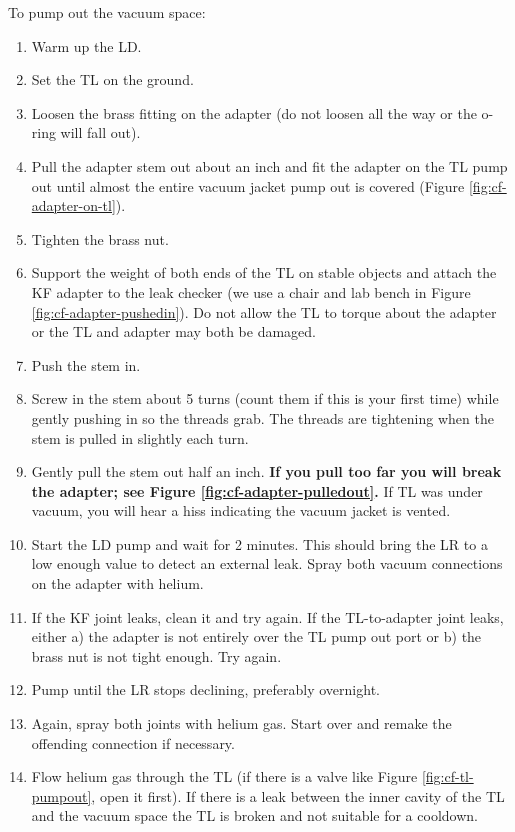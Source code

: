 To pump out the vacuum space:

\begin{enumerate}
 \item Warm up the LD.
 \item Set the TL on the ground.
 \item Loosen the brass fitting on the adapter (do not loosen all the way or the o-ring will fall out).
 \item Pull the adapter stem out about an inch and fit the adapter on the TL pump out until almost the entire vacuum jacket pump out is covered (Figure \ref{fig:cf-adapter-on-tl}).
 \item Tighten the brass nut.
 \item Support the weight of both ends of the TL on stable objects and attach the KF adapter to the leak checker (we use a chair and lab bench in Figure \ref{fig:cf-adapter-pushedin}).  Do not allow the TL to torque about the adapter or the TL and adapter may both be damaged.
 \item Push the stem in.
 \item Screw in the stem about 5 turns (count them if this is your first time) while gently pushing in so the threads grab.  The threads are tightening when the stem is pulled in slightly each turn.
 \item Gently pull the stem out half an inch.  \textbf{If you pull too far you will break the adapter; see Figure \ref{fig:cf-adapter-pulledout}.} If TL was under vacuum, you will hear a hiss indicating the vacuum jacket is vented.  
 \item Start the LD pump and wait for 2 minutes.  This should bring the LR to a low enough value to detect an external leak.  Spray both vacuum connections on the adapter with helium.
 \item If the KF joint leaks, clean it and try again.  If the TL-to-adapter joint leaks, either a) the adapter is not entirely over the TL pump out port or b) the brass nut is not tight enough.  Try again.
 \item Pump until the LR stops declining, preferably overnight.
 \item Again, spray both joints with helium gas.  Start over and remake the offending connection if necessary.
 \item Flow helium gas through the TL (if there is a valve like Figure \ref{fig:cf-tl-pumpout}, open it first).  If there is a leak between the inner cavity of the TL and the vacuum space the TL is broken and not suitable for a cooldown.
\end{enumerate}

